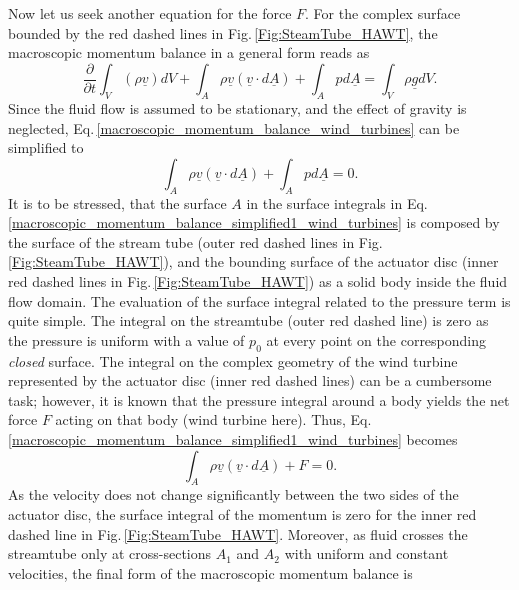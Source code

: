 Now let us seek another equation for the force $F$. For the complex surface bounded by the red dashed lines in Fig.\,\ref{Fig:SteamTube_HAWT}, the macroscopic momentum balance in a general form reads as
%
\begin{equation} \label{macroscopic_momentum_balance_wind_turbines}
\frac{\partial}{\partial t} \int_V \left(\rho \underline{v} \right) dV + \int_A \rho \underline{v} \left( \underline{v} \cdot d\underline{A} \right) + \int_A p d\underline{A} = \int_V \rho \underline{g} dV.
\end{equation}
%
Since the fluid flow is assumed to be stationary, and the effect of gravity is neglected, Eq.\,\eqref{macroscopic_momentum_balance_wind_turbines} can be simplified to
%
\begin{equation} \label{macroscopic_momentum_balance_simplified1_wind_turbines}
\int_A \rho \underline{v} \left( \underline{v} \cdot d\underline{A} \right) + \int_A p d\underline{A} = 0.
\end{equation}
%
It is to be stressed, that the surface $A$ in the surface integrals in Eq.\,\eqref{macroscopic_momentum_balance_simplified1_wind_turbines} is composed by the surface of the stream tube (outer red dashed lines in Fig.\,\ref{Fig:SteamTube_HAWT}), and the bounding surface of the actuator disc (inner red dashed lines in Fig.\,\ref{Fig:SteamTube_HAWT}) as a solid body inside the fluid flow domain. The evaluation of the surface integral related to the pressure term is quite simple. The integral on the streamtube (outer red dashed line) is zero as the pressure is uniform with a value of $p_0$ at every point on the corresponding \textit{closed} surface. The integral on the complex geometry of the wind turbine represented by the actuator disc (inner red dashed lines) can be a cumbersome task; however, it is known that the pressure integral around a body yields the net force $F$ acting on that body (wind turbine here). Thus, Eq.\,\eqref{macroscopic_momentum_balance_simplified1_wind_turbines} becomes
%
\begin{equation} \label{macroscopic_momentum_balance_simplified2_wind_turbines}
\int_A \rho \underline{v} \left( \underline{v} \cdot d\underline{A} \right) + F = 0.
\end{equation}
%
As the velocity does not change significantly between the two sides of the actuator disc, the surface integral of the momentum is zero for the inner red dashed line in Fig.\,\ref{Fig:SteamTube_HAWT}. Moreover, as fluid crosses the streamtube only at cross-sections $A_1$ and $A_2$ with uniform and constant velocities, the final form of the macroscopic momentum balance is
